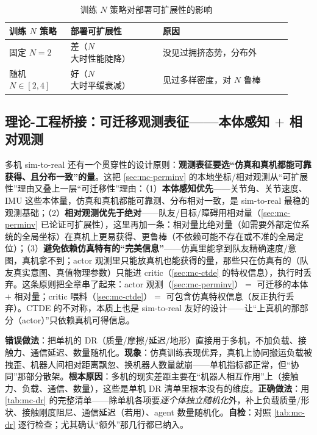 \begin{table}[H]\centering\small
\caption{训练 $N$ 策略对部署可扩展性的影响}
\label{tab:mc-n-random}
\begin{tabular}{p{0.20\linewidth}p{0.30\linewidth}p{0.42\linewidth}}
\toprule
训练 $N$ 策略 & 部署可扩展性 & 原因 \\
\midrule
固定 $N{=}2$ & 差（$N$ 大时性能陡降） & 没见过拥挤态势，分布外 \\
随机 $N\in[2,4]$ & 好（$N$ 大时平缓衰减） & 见过多样密度，对 $N$ 鲁棒 \\
\bottomrule
\end{tabular}
\end{table}

\subsection{理论-工程桥接：可迁移观测表征——本体感知 \texorpdfstring{$+$}{+} 相对观测}
\label{sec:mc-transfer-obs}

多机 sim-to-real 还有一个贯穿性的设计原则：\textbf{观测表征要选“仿真和真机都能可靠获得、且分布一致”的量}。这把 \cref{sec:mc-perminv} 的本地坐标/相对观测从“可扩展性”理由又叠上一层“可迁移性”理由：（1）\textbf{本体感知优先}——关节角、关节速度、IMU 这些本体量，仿真和真机都能可靠测、分布相对一致，是 sim-to-real 最稳的观测基础；（2）\textbf{相对观测优先于绝对}——队友/目标/障碍用相对量（\cref{sec:mc-perminv} 已论证可扩展性），这里再加一条：相对量比绝对量（如需要外部定位系统的全局坐标）在真机上更易获得、更鲁棒（不依赖可能不存在或不准的全局定位）；（3）\textbf{避免依赖仿真特有的“完美信息”}——仿真里能拿到队友精确速度/意图，真机拿不到；actor 观测里只能放真机也能获得的量，那些只在仿真有的（队友真实意图、真值物理参数）只能进 critic（\cref{sec:mc-ctde} 的特权信息），执行时丢弃。这条原则把全章串了起来：actor 观测（\cref{sec:mc-perminv}）$=$ 可迁移的本体 $+$ 相对量；critic 喂料（\cref{sec:mc-ctde}）$=$ 可包含仿真特权信息（反正执行丢弃）。CTDE 的不对称，本质上也是 sim-to-real 友好的设计——让“上真机的那部分（actor）”只依赖真机可得信息。

\begin{pitfall}
\textbf{错误做法}：把单机的 DR（质量/摩擦/延迟/地形）直接用于多机，不加负载、接触力、通信延迟、数量随机化。\textbf{现象}：仿真训练表现优异，真机上协同搬运负载被拽歪、机器人间相对距离飘忽、换机器人数量就崩——单机指标都正常，但“协同”那部分散架。\textbf{根本原因}：多机的现实差距主要在“机器人相互作用”上（接触力、负载、通信、数量），这些是单机 DR 清单里根本没有的维度。\textbf{正确做法}：用 \cref{tab:mc-dr} 的完整清单——除单机各项要\emph{逐个体独立随机化}外，补上负载质量/形状、接触刚度阻尼、通信延迟（若用）、agent 数量随机化。\textbf{自检}：对照 \cref{tab:mc-dr} 逐行检查；尤其确认“额外”那几行都已纳入。
\end{pitfall}


